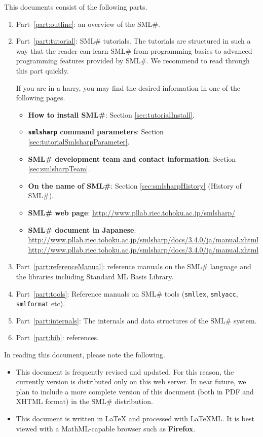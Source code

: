 \documentclass{jbook}
\newcommand{\smlsharp}{SML\#}
\newcommand{\version}{3.4.0}
\newcommand{\documentUrlJa}{\url{http://www.pllab.riec.tohoku.ac.jp/smlsharp/docs/3.4.0/ja/manual.xhtml}}
\begin{document}
\else%
	This documents consist of the following parts.
\begin{enumerate}
\item
	Part~\ref{part:outline}:
an overview of the \smlsharp{}.
\item
	Part~\ref{part:tutorial}: \smlsharp{} tutorials.
	The tutorials are structured in such a way that the reader can
learn \smlsharp{} from programming basics to advanced programming
features provided by \smlsharp{}.
	We recommend to read through this part quickly.

	If you are in a harry, you may find the desired information in
one of the following pages.
\begin{itemize}
\item {\bf How to install \smlsharp{}}:
Section \ref{sec:tutorialInstall}.
\item {\bf {\tt smlsharp} command parameters}:
Section \ref{sec:tutorialSmlsharpParameter}.
\item {\bf \smlsharp{} development team and contact information}:
Section \ref{sec:smlsharpTeam}.
\item {\bf On the name of \smlsharp{}}:
Section \ref{sec:smlsharpHistory} (History of \smlsharp).
\item {\bf \smlsharp{} web page}: 
\url{http://www.pllab.riec.tohoku.ac.jp/smlsharp/}
\item {\bf \smlsharp{} document in Japanese}:
\url{http://www.pllab.riec.tohoku.ac.jp/smlsharp/docs/\version/ja/manual.xhtml}
\documentUrlJa
\end{itemize}

\item
	Part~\ref{part:referenceManual}:
reference manuals on the \smlsharp{} language and the libraries
including Standard ML Basis Library.

\item
	Part~\ref{part:tools}:
Reference manuals on \smlsharp{} tools 
({\tt smllex}, {\tt smlyacc}, {\tt smlformat} etc).

\item
	Part~\ref{part:internals}:
	The internals and data structures of the \smlsharp{} system.

\item
	Part~\ref{part:bib}: references.
\end{enumerate}

In reading this document, please note the following.
\begin{itemize}
\item 
	This document is frequently revised and updated.
	For this reason, the currently version is distributed only on
this web server.
	In near future, we plan to include a more complete version of
this document (both in PDF and XHTML format) in the \smlsharp{}
distribution.

\item 
	This document is written in LaTeX and processed with LaTeXML.
	It is best viewed with a MathML-capable browser such as {\bf
Firefox}.
\end{itemize}
\fi%
\end{document}
